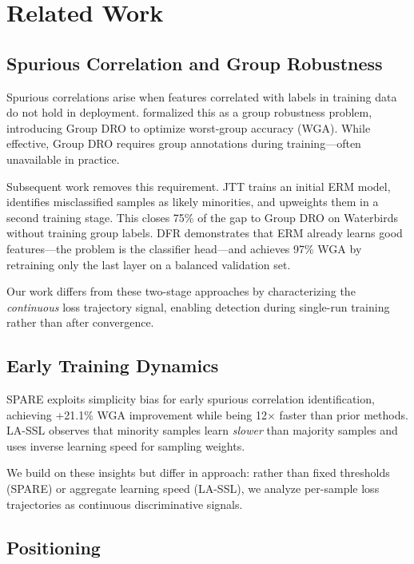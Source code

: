 \section{Related Work}

\subsection{Spurious Correlation and Group Robustness}

Spurious correlations arise when features correlated with labels in training data do not hold in deployment. \citet{sagawa2019distributionally} formalized this as a group robustness problem, introducing Group DRO to optimize worst-group accuracy (WGA). While effective, Group DRO requires group annotations during training---often unavailable in practice.

Subsequent work removes this requirement. JTT \citep{liu2021jtt} trains an initial ERM model, identifies misclassified samples as likely minorities, and upweights them in a second training stage. This closes 75\% of the gap to Group DRO on Waterbirds without training group labels. DFR \citep{izmailov2022feature} demonstrates that ERM already learns good features---the problem is the classifier head---and achieves 97\% WGA by retraining only the last layer on a balanced validation set.

Our work differs from these two-stage approaches by characterizing the \emph{continuous} loss trajectory signal, enabling detection during single-run training rather than after convergence.

\subsection{Early Training Dynamics}

SPARE \citep{yang2023spare} exploits simplicity bias for early spurious correlation identification, achieving +21.1\% WGA improvement while being 12$\times$ faster than prior methods. LA-SSL \citep{zhu2023lassl} observes that minority samples learn \emph{slower} than majority samples and uses inverse learning speed for sampling weights.

We build on these insights but differ in approach: rather than fixed thresholds (SPARE) or aggregate learning speed (LA-SSL), we analyze per-sample loss trajectories as continuous discriminative signals.

\subsection{Positioning}

